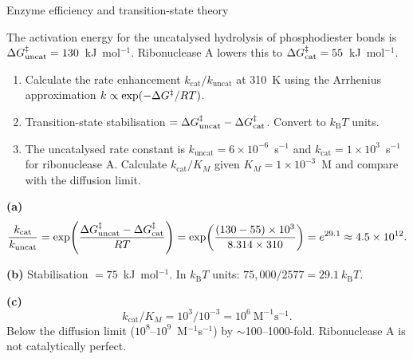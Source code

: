 \documentclass[12pt, a4paper, oneside]{report}
\begin{document}
\begin{problem}{\enspace{}\enspace
  Enzyme efficiency and transition-state theory}

  The activation energy for the uncatalysed hydrolysis of
  phosphodiester bonds is $\Delta G^\ddagger_\text{uncat} = 130$~kJ~mol$^{-1}$.
  Ribonuclease A lowers this to $\Delta G^\ddagger_\text{cat} = 55$~kJ~mol$^{-1}$.

  \begin{enumerate}
    \item Calculate the rate enhancement
          $k_\text{cat}/k_\text{uncat}$ at 310~K using the
          Arrhenius approximation
          $k \propto \exp(-\Delta G^\ddagger/RT)$.
    \item Transition-state stabilisation $= \Delta G^\ddagger_\text{uncat}
          - \Delta G^\ddagger_\text{cat}$. Convert to $k_\mathrm{B}T$ units.
    \item The uncatalysed rate constant is $k_\text{uncat} = 6\times10^{-6}$~s$^{-1}$
          and $k_\text{cat} = 1\times10^3$~s$^{-1}$ for ribonuclease A.
          Calculate $k_\text{cat}/K_M$ given $K_M = 1\times10^{-3}$~M
          and compare with the diffusion limit.
  \end{enumerate}
\end{problem}

\begin{solution}
  \textbf{(a)}
  \[
    \frac{k_\text{cat}}{k_\text{uncat}}
    = \exp\!\left(\frac{\Delta G^\ddagger_\text{uncat} - \Delta G^\ddagger_\text{cat}}{RT}\right)
    = \exp\!\left(\frac{(130-55)\times10^3}{8.314\times310}\right)
    = e^{29.1} \approx 4.5\times10^{12}.
  \]

  \textbf{(b)} Stabilisation $= 75$~kJ~mol$^{-1}$.
  In $k_\mathrm{B}T$ units: $75{,}000/2577 = 29.1~k_\mathrm{B}T$.

  \textbf{(c)}
  \[
    k_\text{cat}/K_M = 10^3 / 10^{-3} = 10^6~\text{M}^{-1}\text{s}^{-1}.
  \]
  Below the diffusion limit ($10^8$--$10^9$~M$^{-1}$s$^{-1}$)
  by $\sim$100--1000-fold. Ribonuclease A is not catalytically perfect.
\end{solution}
\end{document}
